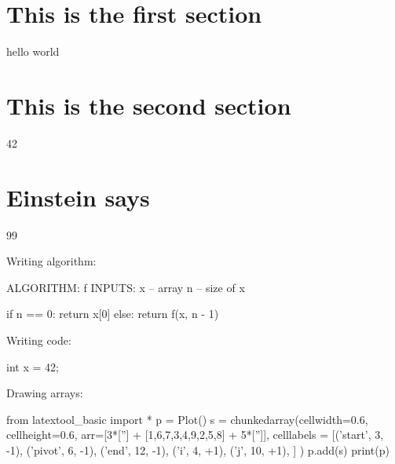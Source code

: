 \section{This is the first section}

hello world

\section{This is the second section}

42


\section{Einstein says}

99

Writing algorithm:
\begin{console}
ALGORITHM: f
INPUTS: x -- array
        n -- size of x

if n == 0:
     return x[0]
else:
     return f(x, n - 1)
\end{console}

Writing code:
\begin{console}
int x = 42;
\end{console}


Drawing arrays:
\begin{python}
from latextool_basic import *
p = Plot()
s = chunkedarray(cellwidth=0.6, 
                 cellheight=0.6,
                 arr=[3*[''] + [1,6,7,3,4,9,2,5,8] + 5*['']],
                 celllabels = [('start',  3, -1),
                               ('pivot',  6, -1),
                               ('end',   12, -1),
                               ('i',      4,  +1),
                               ('j',     10,  +1),
                              ]
)
p.add(s)
print(p)
\end{python}
